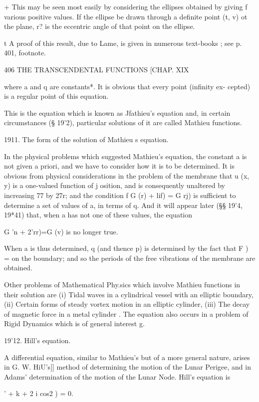 + This may be seen most easily by considering the ellipses obtained by
giving f various positive values. If the ellipse be drawn through a
definite point (t, v) ot the plane, r? is the eccentric angle of that
point on the ellipse.

t A proof of this result, due to Lame, is given in numerous text-books
; see p. 401, footnote.

406 THE TRANSCENDENTAL FUNCTIONS [CHAP. XIX

where a and q are constants*. It is obvious that every point (infinity
ex- cepted) is a regular point of this equation.

This is the equation which is known as Jfathieu's equation and, in
certain circumstances (§ 19'2), particular solutions of it are called
Mathieu functions.

1911. The form of the solution of Mathieu s equation.

In the physical problems which suggested Mathieu's equation, the
constant a is not given a priori, and we have to consider how it is to
be determined. It is obvious from physical considerations in the
problem of the membrane that u (x, y) is a one-valued function of j
osition, and is consequently unaltered by increasing 77 by 27r; and
the condition f G (r) + lif) = G rj) is sufficient to determine a set
of values of a, in terms of q. And it will appear later (§§ 19'4,
19*41) that, when a has not one of these values, the equation

G 'n + 2'rr)=G (v) is no longer true.

When a is thus determined, q (and thence p) is determined by the fact
that F ) = on the boundary; and so the periods of the free vibrations
of the membrane are obtained.

Other problems of Mathematical Phy.sics which involve Mathieu
functions in their solution are (i) Tidal waves in a cylindrical
vessel with an elliptic boundary, (ii) Certain forms of steady vortex
motion in an elliptic cylinder, (iii) The decay of magnetic force in a
metal cylinder . The equation also occurs in a problem of Rigid
Dynamics which is of general interest g.

19'12. Hill's equation.

A differential equation, similar to Mathieu's but of a more general
nature, arises in G. W. HiU's]] method of determining the motion of
the Lunar Perigee, and in Adams' determination of the motion of the
Lunar Node. Hill's equation is

 ' + k + 2 i cos2 ) = 0.

